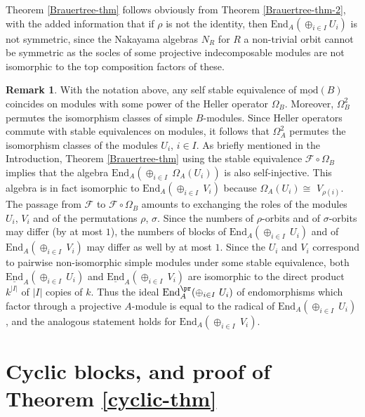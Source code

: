 \documentclass{amsart}
\theoremstyle{plain}\newtheorem{Theorem}{Theorem}[section]
\theoremstyle{plain}\newtheorem{Conjecture}[Theorem]{Conjecture}
\theoremstyle{plain}\newtheorem{Corollary}[Theorem]{Corollary}
\theoremstyle{plain}\newtheorem{Lemma}[Theorem]{Lemma}
\theoremstyle{plain}\newtheorem{Proposition}[Theorem]{Proposition}
\theoremstyle{definition}\newtheorem{Definition}[Theorem]{Definition}
\theoremstyle{definition}\newtheorem{Example}[Theorem]{Example}
\theoremstyle{definition}\newtheorem{Examples}[Theorem]{Examples}
\theoremstyle{definition}\newtheorem{Exercise}[Theorem]{Exercise}
\theoremstyle{definition}\newtheorem{Notation}[Theorem]{Notation}
\theoremstyle{definition}\newtheorem{Remark}[Theorem]{Remark}
\theoremstyle{definition}\newtheorem{Remarks}[Theorem]{Remarks}
\theoremstyle{plain}\newtheorem{Statement}[Theorem]{}
\def\CF{{\mathcal{F}}}  \def\OS{{\mathcal{O}S}}
\def\End{\mathrm{End}}
\def\Endbar{\underline{\mathrm{End}}}
\def\modbar{\underline{\mathrm{mod}}}
\begin{document}
Theorem \ref{Brauertree-thm} follows obviously from Theorem \ref{Brauertree-thm-2},
with the added information that if $\rho$ is not the identity, then 
$\End_A(\oplus_{i\in I} U_i)$ is not symmetric, since the Nakayama algebras $N_R$
for $R$ a non-trivial orbit cannot be symmetric as the socles of some projective
indecomposable modules are not  isomorphic to the top composition factors
of these. 

\begin{Remark} \label{Omega-remark}
With the notation above, any self stable equivalence of $\modbar(B)$ coincides
on modules with some power of the Heller operator $\Omega_B$.
 Moreover,
$\Omega^2_B$ permutes the isomorphism classes of simple $B$-modules.
Since Heller operators commute with stable equivalences on modules, it follows
that $\Omega_A^2$ permutes the isomorphism classes of the modules $U_i$, 
$i\in I$. As briefly mentioned in the Introduction,
Theorem \ref{Brauertree-thm} using the stable equivalence 
$\CF\circ \Omega_B$ implies that the algebra $\End_A(\oplus_{i\in I}\ \Omega_A(U_i))$
is also self-injective. This algebra is in fact isomorphic to $\End_A(\oplus_{i\in I}\ V_i)$
because $\Omega_A(U_i)\cong$ $V_{\rho(i)}$. 
The passage from $\CF$ to $\CF\circ\Omega_B$ amounts to
exchanging the roles of the modules $U_i$, $V_i$ and of the permutations 
$\rho$, $\sigma$.
Since the numbers of $\rho$-orbits and of $\sigma$-orbits may differ  (by at most $1$),
the numbers of blocks of $\End_A(\oplus_{i\in I}\ U_i)$ and of
 $\End_A(\oplus_{i\in I}\ V_i)$ may differ as well by at most $1$.
 Since the $U_i$ and $V_i$ correspond to pairwise non-isomorphic simple modules
 under some stable equivalence, both $\Endbar_A(\oplus_{i\in I}\ U_i)$ and
 $\Endbar_A(\oplus_{i\in I}\ V_i)$ are isomorphic to the direct product $k^{|I|}$
 of $|I|$ copies of $k$. Thus the ideal $\End_A^\pr(\oplus_{i\in I}\ U_i)$ of 
 endomorphisms which factor through a projective $A$-module  is equal to the
 radical of $\End_A(\oplus_{i\in I}\ U_i)$, and the analogous statement holds for
 $\End_A(\oplus_{i\in I}\ V_i)$.
 \end{Remark} 
 
 \section{Cyclic blocks, and proof of Theorem \ref{cyclic-thm}} \label{cyclic-Section}
 
\end{document}
